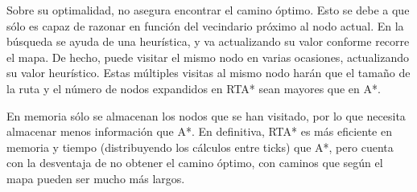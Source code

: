 \documentclass[12pt]{article} %
\begin{document}
Sobre su optimalidad, no asegura encontrar el camino óptimo. Esto se debe a que sólo es capaz de razonar en función del vecindario próximo al nodo actual. En la búsqueda se ayuda de una heurística, y va actualizando su valor conforme recorre el mapa. De hecho, puede visitar el mismo nodo en varias ocasiones, actualizando su valor heurístico. Estas múltiples visitas al mismo nodo harán que el tamaño de la ruta y el número de nodos expandidos en RTA* sean mayores que en A*. 

En memoria sólo se almacenan los nodos que se han visitado, por lo que necesita almacenar menos información que A*. En definitiva, RTA* es más eficiente en memoria y tiempo (distribuyendo los cálculos entre ticks) que A*, pero cuenta con la desventaja de no obtener el camino óptimo, con caminos que según el mapa pueden ser mucho más largos.
\end{document}
